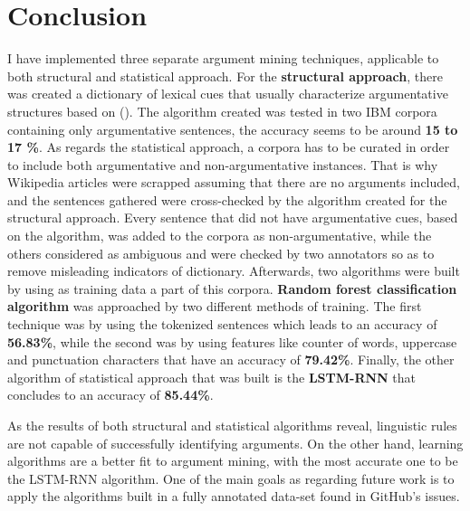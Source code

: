 
\chapter{Conclusion}
\label{Chapter6}

I have implemented three separate argument mining techniques, applicable to both structural and statistical approach. For the \textbf{structural approach}, there was created a dictionary of lexical cues that usually characterize argumentative structures based on (\cite{knott1994using}). The algorithm created was tested in two IBM corpora containing only argumentative sentences, the accuracy seems to be around \textbf{15 to 17 \%}. As regards the statistical approach, a corpora has to be curated in order to include both argumentative and non-argumentative instances. That is why Wikipedia articles were scrapped assuming that there are no arguments included, and the sentences gathered were cross-checked by the algorithm created for the structural approach. Every sentence that did not have argumentative cues, based on the algorithm, was added to the corpora as non-argumentative, while the others considered as ambiguous and were checked by two annotators so as to remove misleading indicators of dictionary. Afterwards, two algorithms were built by using as training data a part of this corpora. \textbf{Random forest classification algorithm} was approached by two different methods of training. The first technique was by using the tokenized sentences which leads to an accuracy of \textbf{56.83\%}, while the second was by using features like counter of words, uppercase and punctuation characters that have an accuracy of \textbf{79.42\%}. Finally, the other algorithm of statistical approach that was built is the \textbf{LSTM-RNN} that concludes to an accuracy of \textbf{85.44\%}. 

As the results of both structural and statistical algorithms reveal, linguistic rules are not capable of successfully identifying arguments. On the other hand, learning algorithms are a better fit to argument mining, with the most accurate one to be the LSTM-RNN algorithm. One of the main goals as regarding future work is to apply the algorithms built in a fully annotated data-set found in GitHub's issues.